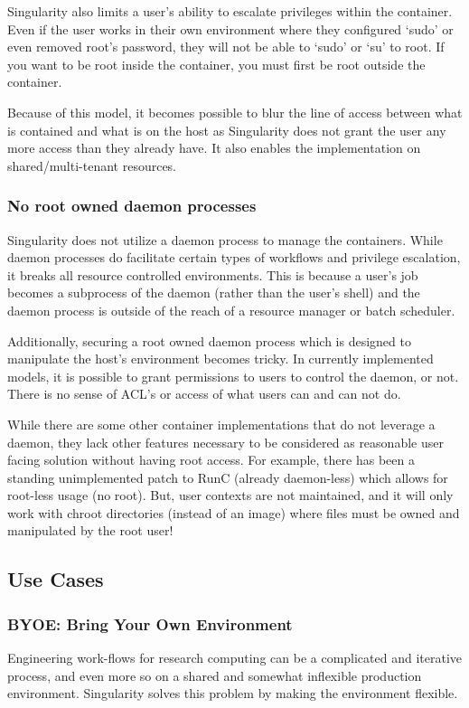 \documentclass[letterpaper,10pt,english]{sphinxmanual}
\begin{document}
Singularity also limits a user’s ability to escalate privileges within the container. Even if the user works in their own environment where they configured ‘sudo’ or even removed root’s password, they will not be able to ‘sudo’ or ‘su’ to root. If you want to be root inside the container, you must first be root outside the container.

Because of this model, it becomes possible to blur the line of access between what is contained and what is on the host as Singularity does not grant the user any more access than they already have. It also enables the implementation on shared/multi-tenant resources.


\subsubsection{No root owned daemon processes}
\label{\detokenize{introduction:no-root-owned-daemon-processes}}
Singularity does not utilize a daemon process to manage the containers. While daemon processes do facilitate certain types of workflows and privilege escalation, it breaks all resource controlled environments. This is because a user’s job becomes a subprocess of the daemon (rather than the user’s shell) and the daemon process is outside of the reach of a resource manager or batch scheduler.

Additionally, securing a root owned daemon process which is designed to manipulate the host’s environment becomes tricky. In currently implemented models, it is possible to grant permissions to users to control the daemon, or not. There is no sense of ACL’s or access of what users can and can not do.

While there are some other container implementations that do not leverage a daemon, they lack other features necessary to be considered as reasonable user facing solution without having root access. For example, there has been a standing unimplemented patch to RunC (already daemon-less) which allows for root-less usage (no root). But, user contexts are not maintained, and it will only work with chroot directories (instead of an image) where files must be owned and manipulated by the root user!


\subsection{Use Cases}
\label{\detokenize{introduction:use-cases}}

\subsubsection{BYOE: Bring Your Own Environment}
\label{\detokenize{introduction:byoe-bring-your-own-environment}}
Engineering work-flows for research computing can be a complicated and iterative process, and even more so on a shared and somewhat inflexible production environment. Singularity solves this problem by making the environment flexible.
\end{document}
